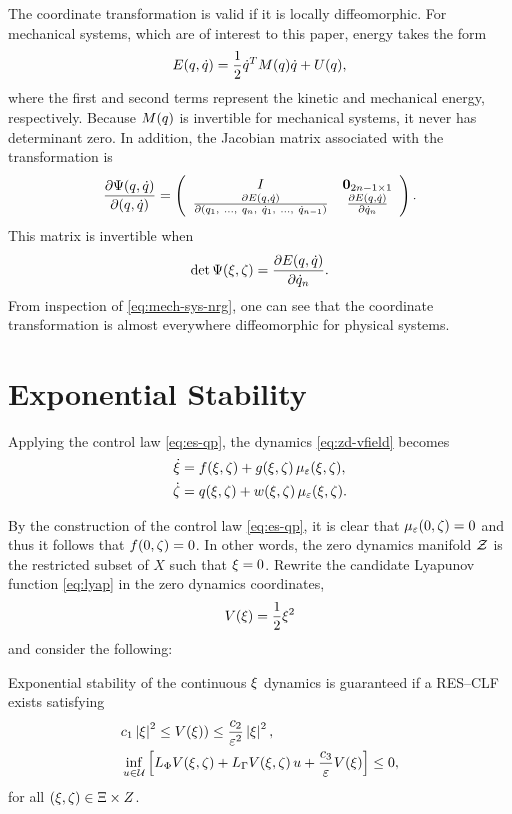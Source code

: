 %
The coordinate transformation is valid if it is locally diffeomorphic.
%
For mechanical systems, which are of interest to this paper, energy takes the form
%
\begin{align}
  \label{eq:mech-sys-nrg}
  E(q, \dot{q}) = \frac{1}{2} \dot{q}^{T} M(q) \dot{q} + U(q),
\end{align}
%
where the first and second terms represent the kinetic and mechanical energy, respectively.
%
Because $M(q)$ is invertible for mechanical systems, it never has determinant zero.
%
In addition, the Jacobian matrix associated with the transformation is
\begin{align}
  \frac{\partial{\Psi(q, \dot{q})}}{\partial{(q, \dot{q})}} =
  \left(\begin{array}{c c}
    I & {\mathbf 0}_{2n-1 \times 1}\\
    \frac{\partial{E(q, \dot{q})}}{\partial{(q_{1}, \ \ldots, \ q_{n}, \ \dot{q}_{1}, \ \ldots, \ \dot{q}_{n-1})}} & \frac{\partial{E(q, \dot{q})}}{\partial{\dot{q}_{n}}}
  \end{array}\right).
\end{align}
%
This matrix is invertible when
\begin{align*}
  \det \Psi(\xi, \zeta) = \frac{\partial{E(q, \dot{q})}}{\partial{\dot{q}_{n}}}.
\end{align*}
From inspection of \eqref{eq:mech-sys-nrg}, one can see that the coordinate transformation is almost everywhere diffeomorphic for physical systems.

\section{Exponential Stability}

Applying the control law \eqref{eq:es-qp}, the dynamics \eqref{eq:zd-vfield} becomes
%
\begin{align}
  \nonumber
  \dot {\xi} &= f(\xi, \zeta) + g(\xi, \zeta) \, \mu_{\varepsilon}(\xi, \zeta),\\
  \dot {\zeta} &= q(\xi, \zeta) + w(\xi, \zeta) \, \mu_{\varepsilon}(\xi, \zeta).
  \label{eq:zd-vfield-cl}
\end{align}

By the construction of the control law \eqref{eq:es-qp}, it is clear that $\mu_{\varepsilon}(0, \zeta) = 0$ and thus it follows that $f(0, \zeta) = 0$.
%
In other words, the zero dynamics manifold $\mathcal{Z}$ is the restricted subset of $X$ such that $\xi = 0$.
%
Rewrite the candidate Lyapunov function \eqref{eq:lyap} in the zero dynamics coordinates,
%
\begin{align}
  V(\xi) = \frac{1}{2} \xi^{2}
\end{align}
and consider the following:\vgap

\begin{proposition}  
  \label{prop:res-clf}
  Exponential stability of the continuous $\xi$ dynamics is guaranteed if a RES--CLF exists satisfying
  \begin{eqnarray}
    \label{eq:lyap-cond-nrg-es}
    &c_{1} \left|\xi\right|^{2} \leq V(\xi)) \leq \frac{c_{2}}{\varepsilon^{2}} \left|\xi\right|^2,\\
    \nonumber
    &\inf_{u \in \mathcal{U}} \left[ L_{\Phi} V(\xi, \zeta) + L_{\Gamma} V(\xi, \zeta) \, u + \frac{c_{3}}{\varepsilon} V(\xi) \right] \leq 0,
  \end{eqnarray}
  for all $(\xi, \zeta) \in \Xi \times Z$.\vgap
\end{proposition}


